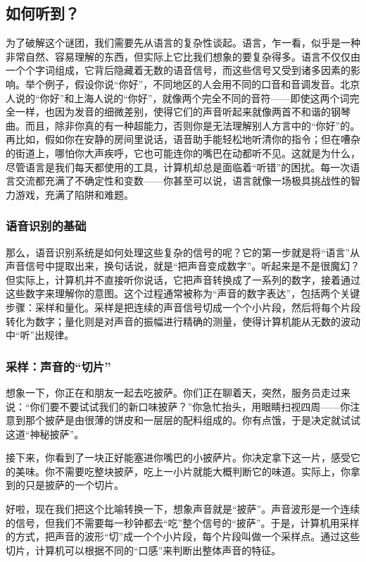 \subsection{如何听到？}

为了破解这个谜团，我们需要先从语言的复杂性谈起。语言，乍一看，似乎是一种非常自然、容易理解的东西，但实际上它比我们想象的要复杂得多。语言不仅仅由一个个字词组成，它背后隐藏着无数的语音信号，而这些信号又受到诸多因素的影响。举个例子，假设你说“你好”，不同地区的人会用不同的口音和音调发音。北京人说的“你好”和上海人说的“你好”，就像两个完全不同的音符——即使这两个词完全一样，也因为发音的细微差别，使得它们的声音听起来就像两首不和谐的钢琴曲。而且，除非你真的有一种超能力，否则你是无法理解别人方言中的“你好”的。再比如，假如你在安静的房间里说话，语音助手能轻松地听清你的指令；但在嘈杂的街道上，哪怕你大声疾呼，它也可能连你的嘴巴在动都听不见。这就是为什么，尽管语言是我们每天都使用的工具，计算机却总是面临着“听错”的困扰。每一次语言交流都充满了不确定性和变数——你甚至可以说，语言就像一场极具挑战性的智力游戏，充满了陷阱和难题。

\subsubsection{语音识别的基础}

那么，语音识别系统是如何处理这些复杂的信号的呢？它的第一步就是将“语言”从声音信号中提取出来，换句话说，就是“把声音变成数字”。听起来是不是很魔幻？但实际上，计算机并不直接听你说话，它把声音转换成了一系列的数字，接着通过这些数字来理解你的意图。这个过程通常被称为“声音的数字表达”，包括两个关键步骤：采样和量化。采样是把连续的声音信号切成一个个小片段，然后将每个片段转化为数字；量化则是对声音的振幅进行精确的测量，使得计算机能从无数的波动中“听”出规律。

\subsubsection{采样：声音的“切片”}

想象一下，你正在和朋友一起去吃披萨。你们正在聊着天，突然，服务员走过来说：“你们要不要试试我们的新口味披萨？”你急忙抬头，用眼睛扫视四周——你注意到那个披萨是由很薄的饼皮和一层层的配料组成的。你有点饿，于是决定就试试这道“神秘披萨”。

接下来，你看到了一块正好能塞进你嘴巴的小披萨片。你决定拿下这一片，感受它的美味。你不需要吃整块披萨，吃上一小片就能大概判断它的味道。实际上，你拿到的只是披萨的一个切片。

好啦，现在我们把这个比喻转换一下，想象声音就是“披萨”。声音波形是一个连续的信号，但我们不需要每一秒钟都去“吃”整个信号的“披萨”。于是，计算机用采样的方式，把声音的波形“切”成一个个小片段，每个片段叫做一个采样点。通过这些切片，计算机可以根据不同的“口感”来判断出整体声音的特征。

